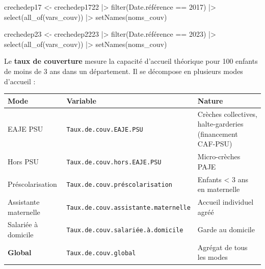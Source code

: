 \documentclass[
  letterpaper,
  DIV=11,
  numbers=noendperiod]{scrartcl}
\newenvironment{Shaded}{\begin{snugshade}}{\end{snugshade}}
\newcommand{\DecValTok}[1]{\textcolor[rgb]{0.68,0.00,0.00}{#1}}
\newcommand{\FunctionTok}[1]{\textcolor[rgb]{0.28,0.35,0.67}{#1}}
\newcommand{\NormalTok}[1]{\textcolor[rgb]{0.00,0.23,0.31}{#1}}
\newcommand{\OtherTok}[1]{\textcolor[rgb]{0.00,0.23,0.31}{#1}}
\newcommand{\SpecialCharTok}[1]{\textcolor[rgb]{0.37,0.37,0.37}{#1}}
\newcounter{none} %
\begin{document}
\begin{Shaded}
\begin{Highlighting}[]
\NormalTok{crechedep17 }\OtherTok{\textless{}{-}}\NormalTok{ crechedep1722 }\SpecialCharTok{|\textgreater{}} \FunctionTok{filter}\NormalTok{(Date.référence }\SpecialCharTok{==} \DecValTok{2017}\NormalTok{) }\SpecialCharTok{|\textgreater{}}
  \FunctionTok{select}\NormalTok{(}\FunctionTok{all\_of}\NormalTok{(vars\_couv)) }\SpecialCharTok{|\textgreater{}} \FunctionTok{setNames}\NormalTok{(noms\_couv)}

\NormalTok{crechedep23 }\OtherTok{\textless{}{-}}\NormalTok{ crechedep2223 }\SpecialCharTok{|\textgreater{}} \FunctionTok{filter}\NormalTok{(Date.référence }\SpecialCharTok{==} \DecValTok{2023}\NormalTok{) }\SpecialCharTok{|\textgreater{}}
  \FunctionTok{select}\NormalTok{(}\FunctionTok{all\_of}\NormalTok{(vars\_couv)) }\SpecialCharTok{|\textgreater{}} \FunctionTok{setNames}\NormalTok{(noms\_couv)}
\end{Highlighting}
\end{Shaded}

Le \textbf{taux de couverture} mesure la capacité d'accueil théorique
pour 100 enfants de moins de 3 ans dans un département. Il se décompose
en plusieurs modes d'accueil :

{\def\LTcaptype{none} %
\begin{longtable}[]{@{}
  >{\raggedright\arraybackslash}p{}
  >{\raggedright\arraybackslash}p{}
  >{\raggedright\arraybackslash}p{}@{}}
\toprule\noalign{}
\begin{minipage}[b]{\linewidth}\raggedright
Mode
\end{minipage} & \begin{minipage}[b]{\linewidth}\raggedright
Variable
\end{minipage} & \begin{minipage}[b]{\linewidth}\raggedright
Nature
\end{minipage} \\
\midrule\noalign{}
\endhead
\bottomrule\noalign{}
\endlastfoot
EAJE PSU & \texttt{Taux.de.couv.EAJE.PSU} & Crèches collectives,
halte-garderies (financement CAF-PSU) \\
Hors PSU & \texttt{Taux.de.couv.hors.EAJE.PSU} & Micro-crèches PAJE \\
Préscolarisation & \texttt{Taux.de.couv.préscolarisation} & Enfants
\textless{} 3 ans en maternelle \\
Assistante maternelle & \texttt{Taux.de.couv.assistante.maternelle} &
Accueil individuel agréé \\
Salariée à domicile & \texttt{Taux.de.couv.salariée.à.domicile} & Garde
au domicile \\
\textbf{Global} & \texttt{Taux.de.couv.global} & Agrégat de tous les
modes \\
\end{longtable}
}
\end{document}
